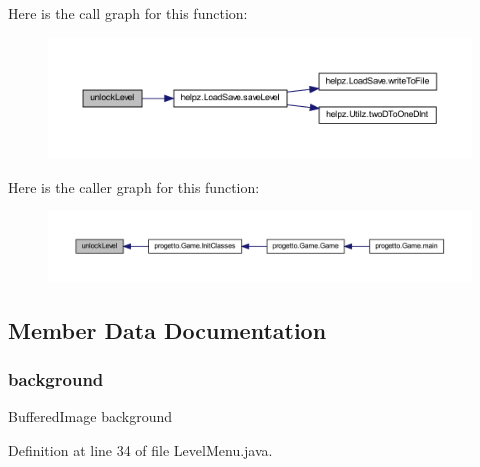 Here is the call graph for this function\+:
\nopagebreak
\begin{figure}[H]
\begin{center}
\leavevmode
\includegraphics[width=350pt]{classui_1_1_level_menu_a90a96ba9679b7df9cc591d4c58430615_cgraph}
\end{center}
\end{figure}
Here is the caller graph for this function\+:\nopagebreak
\begin{figure}[H]
\begin{center}
\leavevmode
\includegraphics[width=350pt]{classui_1_1_level_menu_a90a96ba9679b7df9cc591d4c58430615_icgraph}
\end{center}
\end{figure}


\subsection{Member Data Documentation}
\mbox{\label{classui_1_1_level_menu_a714354485419fb2b615f17fcce85657e}} 
\subsubsection{\texorpdfstring{background}{background}}
{\footnotesize\ttfamily Buffered\+Image background\hspace{0.3cm}{\ttfamily [private]}}



Definition at line 34 of file Level\+Menu.\+java.

\mbox{\label{classui_1_1_level_menu_a6d137cdbda7a4bbab7f28aa72fec0883}} 
